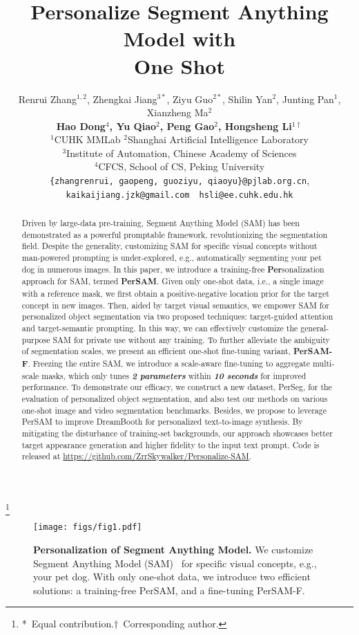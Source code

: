 \documentclass{article} \usepackage{iclr2024_conference,times}
\title{Personalize Segment Anything Model with\\One Shot}
\author{Renrui Zhang$^{1,2}$, Zhengkai Jiang$^{3*}$, Ziyu Guo$^{2*}$, Shilin Yan$^{2}$, Junting Pan$^{1}$, Xianzheng Ma$^{2}$\\\textbf{Hao Dong$^{4}$, Yu Qiao$^{2}$, Peng Gao$^{2}$, Hongsheng Li$^{1\dagger}$}\vspace{0.3cm}\\
  $^1$CUHK MMLab\quad 
  $^2$Shanghai Artificial Intelligence Laboratory\\
  $^3$Institute of Automation, Chinese Academy of Sciences\\
  $^4$CFCS, School of CS, Peking University\vspace{0.1cm}\\
\texttt{\{zhangrenrui, gaopeng, guoziyu, qiaoyu\}@pjlab.org.cn},\\
\texttt{kaikaijiang.jzk@gmail.com}\ \
\texttt{hsli@ee.cuhk.edu.hk}
}
\newcommand\blfootnote[1]{\begingroup
  \renewcommand\thefootnote{}\footnote{#1}\addtocounter{footnote}{-1}\endgroup
}
\begin{document}
\maketitle
\blfootnote{*\ Equal contribution.\quad $\dagger$\ Corresponding author.}

\begin{abstract}
Driven by large-data pre-training, Segment Anything Model (SAM) has been demonstrated as a powerful promptable framework, revolutionizing the segmentation field. 
    Despite the generality, customizing SAM for specific visual concepts without man-powered prompting is under-explored, e.g., automatically segmenting your pet dog in numerous images.
    In this paper, we introduce a training-free \textbf{Per}sonalization approach for SAM, termed \textbf{PerSAM}. 
    Given only one-shot data, i.e., a single image with a reference mask, we first obtain a positive-negative location prior for the target concept in new images. Then, aided by target visual semantics, we empower SAM for personalized object segmentation via two proposed techniques: target-guided attention and target-semantic prompting. In this way, we can effectively customize the general-purpose SAM for private use without any training. 
    To further alleviate the ambiguity of segmentation scales, we present an efficient one-shot fine-tuning variant, \textbf{PerSAM-F}. Freezing the entire SAM, we introduce a scale-aware fine-tuning to aggregate multi-scale masks, which only tunes \textit{\textbf{2 parameters}} within \textit{\textbf{10 seconds}} for improved performance. 
    To demonstrate our efficacy, we construct a new dataset, PerSeg, for the evaluation of personalized object segmentation, and also test our methods on various one-shot image and video segmentation benchmarks.
    Besides, we propose to leverage PerSAM to improve DreamBooth for personalized text-to-image synthesis. By mitigating the disturbance of training-set backgrounds, our approach showcases better target appearance generation and higher fidelity to the input text prompt. Code is released at \url{https://github.com/ZrrSkywalker/Personalize-SAM}.
\end{abstract}

\begin{figure*}[h]
  \centering
\texttt{[image: figs/fig1.pdf]}
   \caption{\textbf{Personalization of Segment Anything Model.} We customize Segment Anything Model (SAM)~\citep{kirillov2023segment} for specific visual concepts, e.g., your pet dog. With only one-shot data, we introduce two efficient solutions: a training-free PerSAM, and a fine-tuning PerSAM-F.}
    \label{fig1}
\end{figure*}
\end{document}
